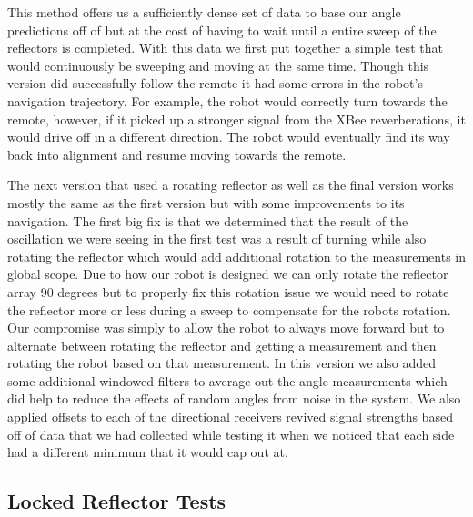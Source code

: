 \vspace*{12pt}
\noindent
This method offers us a sufficiently dense set of data to base our angle predictions off of but at the cost of having to wait until a entire sweep of the reflectors is completed. With this data we first put together a simple test that would continuously be sweeping and moving at the same time. Though this version did successfully follow the remote it had some errors in the robot's navigation trajectory. For example, the robot would correctly turn towards the remote, however, if it picked up a stronger signal from the XBee reverberations, it would drive off in a different direction. The robot would eventually find its way back into alignment and resume moving towards the remote.

\vspace*{12pt}
\noindent
{}
The next version that used a rotating reflector as well as the final version works mostly the same as the first version but with some improvements to its navigation.  The first big fix is that we determined that the result of the oscillation we were seeing in the first test was a result of turning while also rotating the reflector which would add additional rotation to the measurements in global scope. Due to how our robot is designed we can only rotate the reflector array 90 degrees but to properly fix this rotation issue we would need to rotate the reflector more or less during a sweep to compensate for the robots rotation. Our compromise was simply to allow the robot to always move forward but to alternate between rotating the reflector and getting a measurement and then rotating the robot based on that measurement. In this version we also added some additional windowed filters to average out the angle measurements which did help to reduce the effects of random angles from noise in the system. We also applied offsets to each of the directional receivers revived signal strengths based off of data that we had collected while testing it when we noticed that each side had a different minimum that it would cap out at.

\subsection{Locked Reflector Tests}

